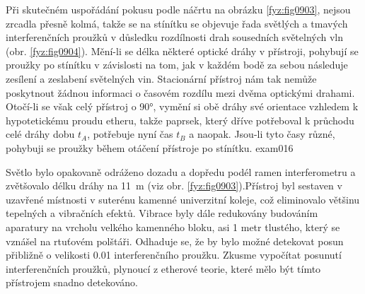 \begin{fyzexam}{Při skutečném uspořádání pokusu podle náčrtu na obrázku \ref{fyz:fig0903}, nejsou
  zrcadla přesně kolmá, takže se na stínítku se objevuje řada světlých a tmavých interferenčních
  proužků v důsledku rozdílnosti drah sousedních světelných vln (obr. \ref{fyz:fig0904}). Mění-li se
  délka některé optické dráhy v přístroji, pohybují se proužky po stínítku v závislosti na tom, jak
  v každém bodě za sebou následuje zesílení a zeslabení světelných vin. Stacionární přístroj nám tak
  nemůže poskytnout žádnou informaci o časovém rozdílu mezi dvěma optickými drahami. Otočí-li se
  však celý přístroj o \ang{90}, vymění si obě dráhy své orientace vzhledem k hypotetickému proudu
  etheru, takže paprsek, který dříve potřeboval k průchodu celé dráhy dobu \(t_A\), potřebuje nyní
  čas \(t_B\) a naopak. Jsou-li tyto časy různé, pohybuji se proužky během otáčení přístroje po
  stínítku.  \hfill\cite[s.~18]{Beiser1975}}{exam016} 

  {\centering
  \captionsetup{type=figure}
  \par}
  \vspace{1em}

  Světlo bylo opakovaně odráženo dozadu a dopředu podél ramen interferometru a zvětšovalo délku
  dráhy na \SI{11}{\metre} (viz obr. \ref{fyz:fig0903}).Přístroj byl sestaven v uzavřené místnosti v
  suterénu kamenné univerzitní koleje, což eliminovalo většinu tepelných a vibračních efektů.
  Vibrace byly dále redukovány budováním aparatury na vrcholu velkého kamenného bloku, asi 1 metr
  tlustého, který se vznášel na rtuťovém polštáři. Odhaduje se, že by bylo možné detekovat posun
  přibližně o velikosti \num{0.01} interferenčního proužku. Zkusme vypočítat posunutí
  interferenčních proužků, plynoucí z etherové teorie, které mělo být tímto přístrojem snadno
  detekováno. 

  {\centering
  \captionsetup{type=figure}
   \par}
  \vspace{1em}


\end{fyzexam}
